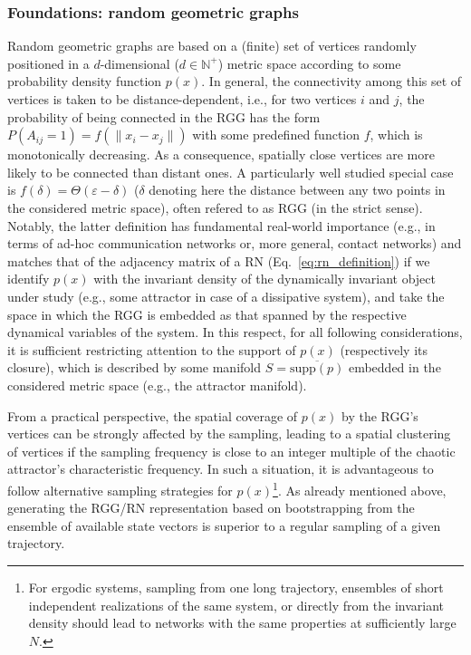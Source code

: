 \subsubsection{Foundations: random geometric graphs}

Random geometric graphs \cite{Penrose2003} are based on a (finite) set of vertices randomly positioned in a $d$-dimensional ($d\in\mathbb{N}^+$) metric space according to some probability density function $p(x)$. In general, the connectivity among this set of vertices is taken to be distance-dependent, i.e., for two vertices $i$ and $j$, the probability of being connected in the RGG has the form $P(A_{ij}=1)=f(\|x_i-x_j\|)$ with some predefined function $f$, which is monotonically decreasing. As a consequence, spatially close vertices are more likely to be connected than distant ones. A particularly well studied special case is $f(\delta)=\Theta(\varepsilon-\delta)$ ($\delta$ denoting here the distance between any two points in the considered metric space), often refered to as RGG (in the strict sense). Notably, the latter definition has fundamental real-world importance (e.g., in terms of ad-hoc communication networks or, more general, contact networks) and matches that of the adjacency matrix of a RN (Eq.~\ref{eq:rn_definition}) if we identify $p(x)$ with the invariant density of the dynamically invariant object under study (e.g., some attractor in case of a dissipative system), and take the space in which the RGG is embedded as that spanned by the respective dynamical variables of the system. In this respect, for all following considerations, it is sufficient restricting attention to the support of $p(x)$ (respectively its closure), which is described by some manifold $S=\overline{\mbox{supp}(p)}$ embedded in the considered metric space (e.g., the attractor manifold).

From a practical perspective, the spatial coverage of $p(x)$ by the RGG's vertices can be strongly affected by the sampling, leading to a spatial clustering of vertices if the sampling frequency is close to an integer multiple of the chaotic attractor's characteristic frequency. In such a situation, it is advantageous to follow alternative sampling strategies for $p(x)$\footnote{For ergodic systems, sampling from one long trajectory, ensembles of short independent realizations of the same system, or directly from the invariant density should lead to networks with the same properties at sufficiently large $N$.}. As already mentioned above, generating the RGG/RN representation based on bootstrapping from the ensemble of available state vectors is superior to a regular sampling of a given trajectory.

